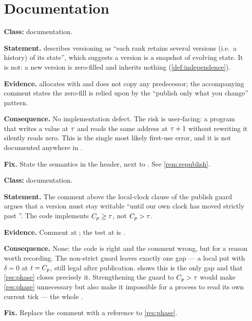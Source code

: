 \section{Documentation}

\begin{deviation}\label{dev:non-inheriting}
\textbf{Class:} documentation.

\textbf{Statement.} \cite{dstm2026} describes versioning as ``each \gls{rank}
retains several \glspl{version} (i.e.\ a \gls{history}) of its state'', which suggests a
version is a snapshot of evolving state. It is not: a new version is
zero-filled and inherits nothing (\cref{def:independence}).

\textbf{Evidence.}  allocates
with  and does not copy any predecessor; the
accompanying comment states the zero-fill is relied upon by the
``publish only what you change'' pattern.

\textbf{Consequence.} No implementation defect. The risk is user-facing: a
program that writes a value at $\tau$ and reads the same address at $\tau+1$
without rewriting it silently reads zero. This is the single most likely
first-use error, and it is not documented anywhere in .

\textbf{Fix.} State the semantics in the header, next to
. See \cref{rem:republish}.
\end{deviation}

\begin{deviation}\label{dev:phase-strictness}
\textbf{Class:} documentation.

\textbf{Statement.} The comment above the local-clock clause of the publish
guard argues that a version must stay writable ``until our own clock has moved
strictly past ''. The code implements $C_{p} \ge \tau$, not
$C_{p} > \tau$.

\textbf{Evidence.} Comment at ; the test at
 is .

\textbf{Consequence.} None: the code is right and the comment wrong, but for a
reason worth recording. The non-strict guard leaves exactly one gap --- a
local put with $\delta = 0$ at $t = C_{p}$, still legal after publication.
 shows this is the only gap and that
\cref{res:phase} closes precisely it. Strengthening the guard to $C_{p} >
\tau$ would make \cref{res:phase} unnecessary but also make it impossible for
a process to read its own current tick --- the whole .

\textbf{Fix.} Replace the comment with a reference to \cref{res:phase}.
\end{deviation}

